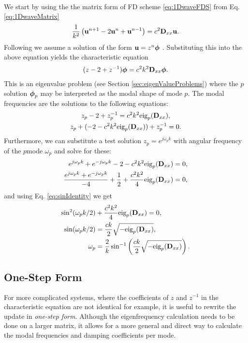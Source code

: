 {{We start by using the the matrix form of FD scheme \eqref{eq:1DwaveFDS} from Eq. \eqref{eq:1DwaveMatrix}
\begin{equation*}
    \frac{1}{k^2}\left(\mathbf{u}^{n+1}-2\mathbf{u}^n+\mathbf{u}^{n-1}\right) = c^2 \mathbf{D}_{xx}\mathbf{u}.
\end{equation*}
Following \cite{theBible} we assume a solution of the form $\mathbf{u} = z^n\boldsymbol{\phi}$ . Substituting this into the above equation yields the characteristic equation
\begin{equation}
    (z - 2 + z^{-1})\boldsymbol{\phi} = c^2k^2\mathbf{D}_{xx} \boldsymbol{\phi}.
\end{equation}
This is an eigenvalue problem (see Section \ref{sec:eigenValueProblems}) where the $p$\th solution $\boldsymbol{\phi}_p$ may be interpreted as the modal shape of mode $p$. The modal frequencies are the solutions to the following equations:
\begin{gather}
    z_p-2+z_p^{-1} = c^2k^2\text{eig}_p(\mathbf{D}_{xx}),\nonumber\\
    z_p+(-2-c^2k^2\text{eig}_p(\mathbf{D}_{xx}))+z_p^{-1}=0.
\end{gather}
 Furthermore, we can substitute a test solution $z_p=e^{j\omega_pk}$ with angular frequency of the $p$\th mode $\omega_p$ and solve for these:
\begin{align*}
    e^{j\omega_pk}+e^{-j\omega_pk}-2-c^2k^2\text{eig}_p(\mathbf{D}_{xx})&=0,\\
    \frac{e^{j\omega_pk}+e^{-j\omega_pk}}{-4}+\frac{1}{2}+\frac{c^2k^2}{4}\text{eig}_p(\mathbf{D}_{xx})&=0,
\end{align*}
and using Eq. \eqref{eq:sinIdentity} we get
\begin{align}
    \sin^2(\omega_pk/2)&+\frac{c^2k^2}{4}\text{eig}_p(\mathbf{D}_{xx})=0,\nonumber\\
    \sin(\omega_pk/2)&=\frac{ck}{2}\sqrt{-\text{eig}_p(\mathbf{D}_{xx})},\nonumber\\
    \omega_p &= \frac{2}{k}\sin^{-1}\left(\frac{ck}{2}\sqrt{-\text{eig}_p(\mathbf{D}_{xx})}\right).
\end{align}

\subsection{One-Step Form}\label{sec:oneStepForm}
For more complicated systems, where the coefficients of $z$ and $z^{-1}$ in the characteristic equation are not identical for example, it is useful to rewrite the update in \textit{one-step form}. Although the eigenfrequency calculation needs to be done on a larger matrix, it allows for a more general and direct way to calculate the modal frequencies and damping coefficients per mode. 

}}
